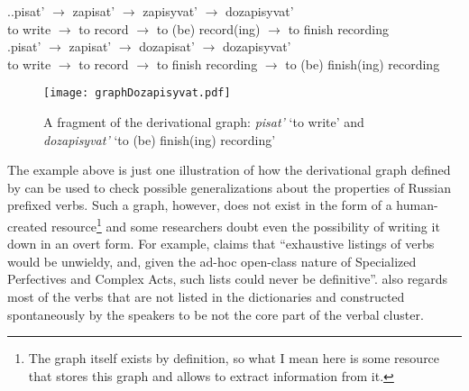 \ex.\label{deriv:dozapisyvat}\ag.\label{deriv:dozapisyvat1}pisat'\textsuperscript{\IPF} $\rightarrow$ zapisat'\textsuperscript{\PF} $\rightarrow$ zapisyvat'\textsuperscript{\PF} $\rightarrow$ dozapisyvat'\textsuperscript{\PF}\\
{to write} $\rightarrow$ {to record} $\rightarrow$ {to (be) record(ing)} $\rightarrow$ {to finish recording}\\
\bg.\label{deriv:dozapisyvat2}pisat'\textsuperscript{\IPF} $\rightarrow$ zapisat'\textsuperscript{\PF} $\rightarrow$ dozapisat'\textsuperscript{\PF} $\rightarrow$ dozapisyvat'\textsuperscript{\IPF}\\
{to write} $\rightarrow$ {to record} $\rightarrow$ {to finish recording} $\rightarrow$ {to (be) finish(ing) recording}\\				

\begin{figure}
\begin{center}
\texttt{[image: graphDozapisyvat.pdf]}
\caption{A fragment of the derivational graph: \textit{pisat'} `to write' and \textit{dozapisyvat'} `to (be) finish(ing) recording'\label{tree:dozapisyvat}}
\end{center}
\end{figure}			

The example above is just one illustration of how the derivational graph defined by  can be used to check possible generalizations about the properties of Russian prefixed verbs. Such a graph, however, does not exist in the form of a human-created resource\footnote{The graph itself exists by definition, so what I mean here is some resource that stores this graph and allows to extract information from it.} and some researchers doubt even the possibility of writing it down in an overt form. For example, \citet[625]{Janda:07a} claims that ``exhaustive listings of verbs would be unwieldy, and, given the ad-hoc open-class nature of Specialized Perfectives and Complex Acts, such lists could never be definitive''. \citet[626]{Janda:07a} also regards most of the verbs that are not listed in the dictionaries and constructed spontaneously by the speakers to be not the core part of the verbal cluster. 

